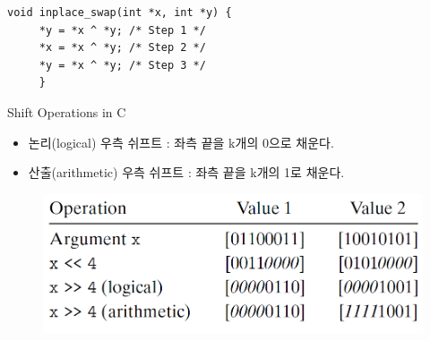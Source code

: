 \begin{lstlisting}[style = CStyle]
    void inplace_swap(int *x, int *y) {
     *y = *x ^ *y; /* Step 1 */
     *x = *x ^ *y; /* Step 2 */
     *y = *x ^ *y; /* Step 3 */
     }
    \end{lstlisting}
    
    
    Shift Operations in C
    
    \begin{itemize}
        \item  논리(logical) 우측 쉬프트 : 좌측 끝을 k개의 0으로 채운다.
        \item  산출(arithmetic) 우측 쉬프트 : 좌측 끝을 k개의 1로 채운다.
    \end{itemize}
    
    \begin{figure}[h!]
        \centering
        \includegraphics[scale=0.4]{pic/section1and2/shift}
    \end{figure}
    
